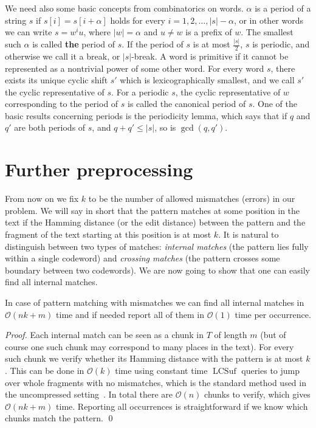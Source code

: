\documentclass[runningheads]{llncs}
\DeclareMathOperator{\LCSuf}{LCSuf}
\begin{document}
We need also some basic concepts from combinatorics on words. $\alpha$ is a period of a string $s$ if $s[i]=s[i+\alpha]$ holds for every $i=1,2,\ldots,|s|-\alpha$, or in other words
we can write $s=w^i u$, where $|w|=\alpha$ and $u\neq w$ is a prefix of $w$. The smallest such $\alpha$
is called {\bf the} period of $s$. If the period of $s$ is at most $\frac{|s|}{2}$, $s$ is periodic, and otherwise we call it a break, or $|s|$-break. A word is primitive if it cannot be
represented as a nontrivial power of some other word. For every word $s$, there exists its unique cyclic shift $s'$ which is lexicographically smallest, and we call $s'$
the cyclic representative of $s$. For a periodic $s$, the cyclic representative of $w$ corresponding to the period of $s$ is called the canonical period of $s$. One of the basic
results concerning periods is the periodicity lemma, which says that if $q$ and $q'$ are both periods of $s$, and $q+q'\leq |s|$, so is $\gcd(q,q')$.

\section{Further preprocessing}
\label{section:further}

From now on we fix $k$ to be the number of allowed mismatches (errors) in our problem. We will say in short that the pattern matches at some position in the text if the Hamming distance (or the edit distance) between the pattern and the fragment of the text starting at this position is at most $k$. It is natural to distinguish between two types of matches: {\it internal matches} (the pattern lies fully within a single codeword) and  {\it crossing matches} (the pattern crosses some boundary between two codewords). We are now going to show that one can easily find all internal matches. 


\begin{lemma}\label{lemma:internal_matches}
In case of pattern matching with mismatches we can find all internal matches in $\mathcal{O}(nk+m)$ time and if needed report all of them in $\mathcal{O}(1)$ time per occurrence.
\end{lemma}
\begin{proof}
Each internal match can be seen as a chunk in $T$ of length $m$ (but of course one such chunk may correspond to many places in the text). For every such chunk we verify whether its Hamming distance with the pattern is at most $k$. This can be done in $\mathcal{O}(k)$ time using constant time $\LCSuf$ queries to jump over whole fragments with no mismatches, which is the standard method used in the uncompressed setting~\cite{LandauMismatches}. In total there are $\mathcal{O}(n)$ chunks to verify, which gives $\mathcal{O}(nk+m)$ time. Reporting all occurrences is straightforward if we know which chunks match the pattern.
\qed
\end{proof}
\end{document}
